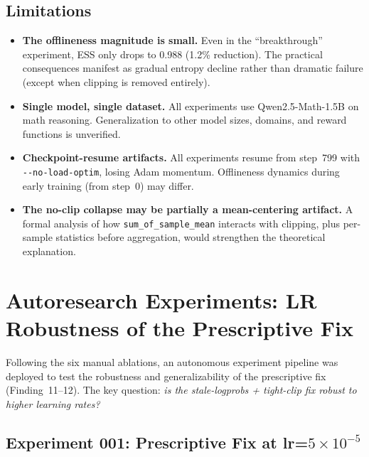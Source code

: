 \documentclass[11pt,a4paper]{article}
\begin{document}
\subsection{Limitations}

\begin{itemize}[leftmargin=*]
  \item \textbf{The offlineness magnitude is small.} Even in the ``breakthrough''
    experiment, ESS only drops to 0.988 (1.2\% reduction). The practical
    consequences manifest as gradual entropy decline rather than dramatic
    failure (except when clipping is removed entirely).

  \item \textbf{Single model, single dataset.} All experiments use
    Qwen2.5-Math-1.5B on math reasoning. Generalization to other model sizes,
    domains, and reward functions is unverified.

  \item \textbf{Checkpoint-resume artifacts.} All experiments resume from
    step~799 with \texttt{-{}-no-load-optim}, losing Adam momentum. Offlineness
    dynamics during early training (from step~0) may differ.

  \item \textbf{The no-clip collapse may be partially a mean-centering
    artifact.} A formal analysis of how \texttt{sum\_of\_sample\_mean}
    interacts with clipping, plus per-sample statistics before aggregation,
    would strengthen the theoretical explanation.
\end{itemize}


\section{Autoresearch Experiments: LR Robustness of the Prescriptive Fix}
\label{sec:autoresearch}

Following the six manual ablations, an autonomous experiment pipeline was
deployed to test the robustness and generalizability of the prescriptive fix
(Finding~11--12). The key question: \emph{is the stale-logprobs + tight-clip
fix robust to higher learning rates?}

\subsection{Experiment 001: Prescriptive Fix at lr=$5 \times 10^{-5}$}
\end{document}
